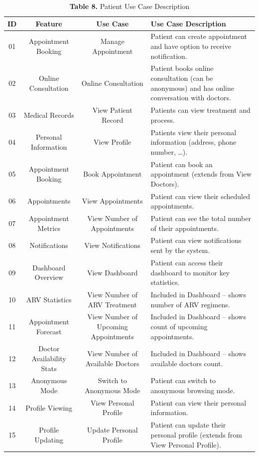\documentclass[12pt,a4paper]{article}
\begin{document}
\begin{table}[H]
\centering
\renewcommand{\arraystretch}{1.5}
\begin{tabular}{|c|c|c|p{7.5cm}|}
\hline
\textbf{ID} & \textbf{Feature} & \textbf{Use Case} & \textbf{Use Case Description} \\
\hline
01 & Appointment Booking & Manage Appointment & Patient can create appointment and have option to receive notification. \\
\hline
02 & Online Consultation & Online Consultation & Patient books online consultation (can be anonymous) and has online conversation with doctors. \\
\hline
03 & Medical Records & View Patient Record & Patients can view treatment and process. \\
\hline
04 & Personal Information & View Profile & Patients view their personal information (address, phone number, …). \\
\hline
05 & Appointment Booking & Book Appointment & Patient can book an appointment (extends from View Doctors). \\
\hline
06 & Appointments & View Appointments & Patient can view their scheduled appointments. \\
\hline
07 & Appointment Metrics & View Number of Appointments & Patient can see the total number of their appointments. \\
\hline
08 & Notifications & View Notifications & Patient can view notifications sent by the system. \\
\hline
09 & Dashboard Overview & View Dashboard & Patient can access their dashboard to monitor key statistics. \\
\hline
10 & ARV Statistics & View Number of ARV Treatment & Included in Dashboard – shows number of ARV regimens. \\
\hline
11 & Appointment Forecast & View Number of Upcoming Appointments & Included in Dashboard – shows count of upcoming appointments. \\
\hline
12 & Doctor Availability Stats & View Number of Available Doctors & Included in Dashboard – shows available doctors count. \\
\hline
13 & Anonymous Mode & Switch to Anonymous Mode & Patient can switch to anonymous browsing mode. \\
\hline
14 & Profile Viewing & View Personal Profile & Patient can view their personal information. \\
\hline
15 & Profile Updating & Update Personal Profile & Patient can update their personal profile (extends from View Personal Profile). \\
\hline
\end{tabular}
\caption*{\textbf{Table 8.} Patient Use Case Description}
\label{tab:patient-usecases}
\end{table}
\end{document}
